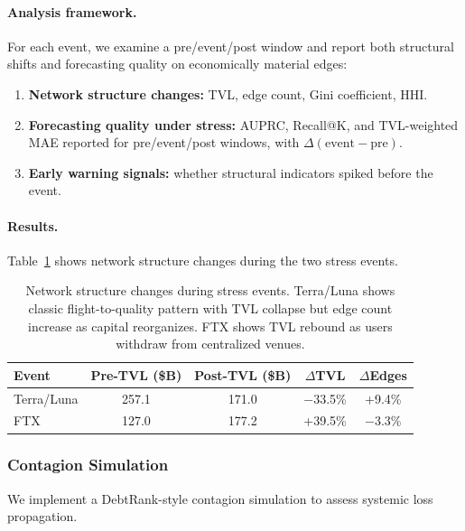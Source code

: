 \paragraph{Analysis framework.}
For each event, we examine a pre/event/post window and report both structural shifts and forecasting quality on economically material edges:
\begin{enumerate}
  \item \textbf{Network structure changes:} TVL, edge count, Gini coefficient, HHI.
  \item \textbf{Forecasting quality under stress:} AUPRC, Recall@K, and TVL-weighted MAE reported for pre/event/post windows, with $\Delta(\text{event} - \text{pre})$.
  \item \textbf{Early warning signals:} whether structural indicators spiked before the event.
\end{enumerate}

\paragraph{Results.}
Table~\ref{tab:shock-results} shows network structure changes during the two stress events.

\begin{table}[t]
\centering
\small
\begin{tabular}{lcccc}
\hline
\textbf{Event} & \textbf{Pre-TVL (\$B)} & \textbf{Post-TVL (\$B)} & \textbf{$\Delta$TVL} & \textbf{$\Delta$Edges} \\
\hline
Terra/Luna & 257.1 & 171.0 & $-$33.5\% & +9.4\% \\
FTX & 127.0 & 177.2 & +39.5\% & $-$3.3\% \\
\hline
\end{tabular}
\caption{Network structure changes during stress events. Terra/Luna shows classic flight-to-quality pattern with TVL collapse but edge count increase as capital reorganizes. FTX shows TVL rebound as users withdraw from centralized venues.}
\label{tab:shock-results}
\end{table}

\subsubsection{Contagion Simulation}
\label{subsubsec:contagion}

We implement a DebtRank-style contagion simulation to assess systemic loss propagation.

